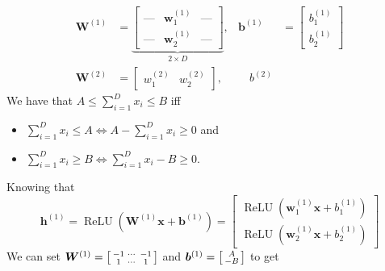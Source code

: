 \documentclass[11pt]{article}
\DeclareMathOperator{\relu}{ReLU}
\begin{document}
\begin{align*}
  \bm{W}^{(1)} &= \underbrace{\begin{bmatrix}
                   \text{---} &\bm{w}^{(1)}_{1}  &\text{---} \\
                   \text{---} &\bm{w}^{(1)}_{2} &\text{---}
                 \end{bmatrix}}_{2 \times D}, &\bm{b}^{(1)} &= \begin{bmatrix}
                                                  b^{(1)}_{1} \\
                                                  b^{(1)}_{2}
                                                 \end{bmatrix} \\
  \bm{W}^{(2)} &= \begin{bmatrix}
                   w^{(2)}_{1} & w^{(2)}_{2}
                 \end{bmatrix}, &\quad b^{(2)} &
\end{align*}
We have that $A \leq \sum_{i = 1}^{D} x_{i} \leq B$ iff
\begin{itemize}
\item $\sum_{i = 1}^{D} x_{i} \leq A \iff A - \sum_{i = 1}^{D} x_{i} \geq 0$ and
\item $\sum_{i = 1}^{D} x_{i} \geq B \iff \sum_{i = 1}^{D} x_{i} - B \geq 0$.
\end{itemize}
Knowing that
\begin{equation*}
  \bm{h}^{(1)} = \relu \left( \bm{W}^{(1)} \bm{x} + \bm{b}^{(1)} \right) = \begin{bmatrix}
                                                                             \relu \left( \bm{w}^{(1)}_{1} \bm{x} + b^{(1)}_{1} \right) \\
                                                                             \relu \left( \bm{w}^{(1)}_{2} \bm{x} + b^{(1)}_{2} \right)
                                                                           \end{bmatrix}
                                                                         \end{equation*}
We can set $\bm{W}^{(1)} = \begin{bsmallmatrix} -1 &\cdots &-1 \\
                       1 &\cdots &1 \end{bsmallmatrix}$ and $\bm{b}^{(1)} = \begin{bsmallmatrix}
                                                                          A \\
                                                                          -B                                                                       \end{bsmallmatrix}$ to get
\end{document}
